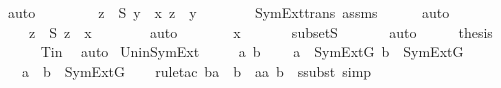 \begin{isabellebody}
\ auto\isanewline
\ \ \isamarkupfalse%
\ \isamarkupfalse%
\ {\isachardoublequoteopen}{\isachardot}{\kern0pt}{\isachardot}{\kern0pt}{\isachardot}{\kern0pt}\ {\isacharequal}{\kern0pt}\ {\isacharbraceleft}{\kern0pt}\ z\ {\isasymin}\ S{\isachardot}{\kern0pt}\ {\isasymexists}y\ {\isasymin}\ x{\isachardot}{\kern0pt}\ z\ {\isasymin}\ y\ {\isacharbraceright}{\kern0pt}{\isachardoublequoteclose}\ \isanewline
\ \ \ \ \isamarkupfalse%
\ SymExt{\isacharunderscore}{\kern0pt}trans\ assms\isanewline
\ \ \ \ \isamarkupfalse%
\ auto\isanewline
\ \ \isamarkupfalse%
\ \isamarkupfalse%
\ {\isachardoublequoteopen}{\isachardot}{\kern0pt}{\isachardot}{\kern0pt}{\isachardot}{\kern0pt}\ {\isacharequal}{\kern0pt}\ {\isacharbraceleft}{\kern0pt}\ z\ {\isasymin}\ S{\isachardot}{\kern0pt}\ z\ {\isasymin}\ {\isasymUnion}x\ {\isacharbraceright}{\kern0pt}{\isachardoublequoteclose}\ \isanewline
\ \ \ \ \isamarkupfalse%
\ auto\isanewline
\ \ \isamarkupfalse%
\ \isamarkupfalse%
\ {\isachardoublequoteopen}{\isachardot}{\kern0pt}{\isachardot}{\kern0pt}{\isachardot}{\kern0pt}\ {\isacharequal}{\kern0pt}\ {\isasymUnion}x{\isachardoublequoteclose}\ \isanewline
\ \ \ \ \isamarkupfalse%
\ subsetS\ \isanewline
\ \ \ \ \isamarkupfalse%
\ auto\isanewline
\ \ \isamarkupfalse%
\ \isamarkupfalse%
\ {\isacharquery}{\kern0pt}thesis\ \isanewline
\ \ \ \ \isamarkupfalse%
\ Tin\ \isamarkupfalse%
\ auto\isanewline
{}\isamarkupfalse%
%
\endisatagproof
{\isafoldproof}%
%
\isadelimproof
\isanewline
%
\endisadelimproof
\isanewline
{}\isamarkupfalse%
\ Un{\isacharunderscore}{\kern0pt}in{\isacharunderscore}{\kern0pt}SymExt\ {\isacharcolon}{\kern0pt}\ \isanewline
\ \ \ a\ b\ \isanewline
\ \ \ {\isachardoublequoteopen}a\ {\isasymin}\ SymExt{\isacharparenleft}{\kern0pt}G{\isacharparenright}{\kern0pt}{\isachardoublequoteclose}\ {\isachardoublequoteopen}b\ {\isasymin}\ SymExt{\isacharparenleft}{\kern0pt}G{\isacharparenright}{\kern0pt}{\isachardoublequoteclose}\ \isanewline
\ \ \ {\isachardoublequoteopen}a\ {\isasymunion}\ b\ {\isasymin}\ SymExt{\isacharparenleft}{\kern0pt}G{\isacharparenright}{\kern0pt}{\isachardoublequoteclose}\ \isanewline
%
\isadelimproof
\isanewline
\ \ %
\endisadelimproof
%
\isatagproof
{}\isamarkupfalse%
{\isacharparenleft}{\kern0pt}rule{\isacharunderscore}{\kern0pt}tac\ b{\isacharequal}{\kern0pt}{\isachardoublequoteopen}a\ {\isasymunion}\ b{\isachardoublequoteclose}\ \ a{\isacharequal}{\kern0pt}{\isachardoublequoteopen}{\isasymUnion}{\isacharbraceleft}{\kern0pt}a{\isacharcomma}{\kern0pt}\ b{\isacharbraceright}{\kern0pt}{\isachardoublequoteclose}\ \ ssubst{\isacharcomma}{\kern0pt}\ simp{\isacharparenright}{\kern0pt}\isanewline

\end{isabellebody}
